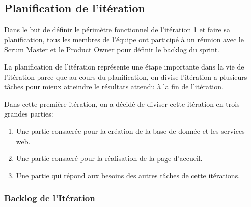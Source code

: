 

\subsection{Planification de l'itération}

Dans le but de définir le périmètre fonctionnel de l'itération 1 et faire sa
planification, tous les membres de l'équipe ont participé à un réunion avec le
Scrum Master et le Product Owner pour définir le backlog du sprint.

La planification de l'itération représente une étape importante dans la vie de
l'itération parce que au cours du planification, on divise l'itération a
plusieurs tâches pour mieux atteindre le résultats attendu à la fin de
l'itération.

Dans cette première itération, on a décidé de diviser cette itération en trois
grandes parties:

\begin{enumerate}
    \item Une partie consacrée pour la création de la base de donnée et les
        services web.
 \item Une partie consacré pour la réalisation de la page d'accueil.
 \item Une partie qui répond aux besoins des autres tâches de cette itérations.
\end{enumerate}

\subsubsection{Backlog de l'Itération}

